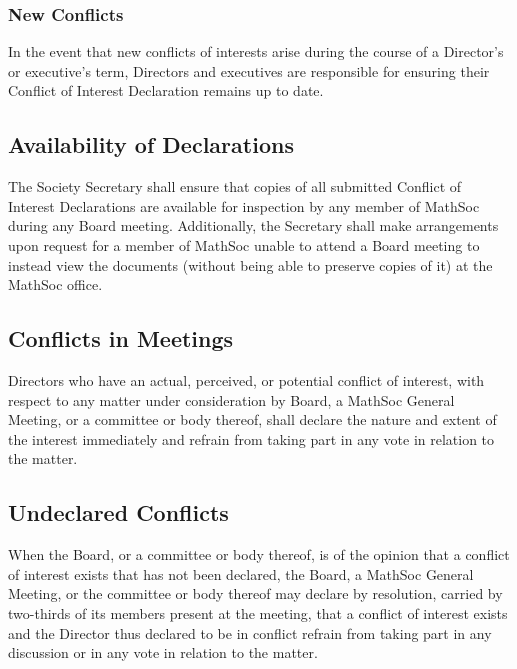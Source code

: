 \subsubsection{New Conflicts}
In the event that new conflicts of interests arise during the course of a Director’s or executive’s term, Directors and executives are responsible for ensuring their Conflict of Interest Declaration remains up to date.

\subsection{Availability of Declarations}
The Society Secretary shall ensure that copies of all submitted Conflict of Interest Declarations are available for inspection by any member of MathSoc during any Board meeting. Additionally, the Secretary shall make arrangements upon request for a member of MathSoc unable to attend a Board meeting to instead view the documents (without being able to preserve copies of it) at the MathSoc office.

\subsection{Conflicts in Meetings}
Directors who have an actual, perceived, or potential conflict of interest, with respect to any matter under consideration by Board, a MathSoc General Meeting, or a committee or body thereof, shall declare the nature and extent of the interest immediately and refrain from taking part in any vote in relation to the matter.

\subsection{Undeclared Conflicts}
When the Board, or a committee or body thereof, is of the opinion that a conflict of interest exists that has not been declared, the Board, a MathSoc General Meeting, or the committee or body thereof may declare by resolution, carried by two-thirds of its members present at the meeting, that a conflict of interest exists and the Director thus declared to be in conflict refrain from taking part in any discussion or in any vote in relation to the matter.
